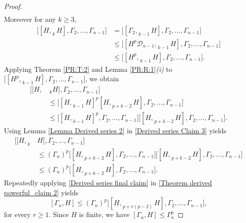 \documentclass[12pt]{elsarticle}
\newtheorem*{main corollary*}{Main Corollary}
\theoremstyle{definition}
\begin{document}
\begin{proof}
\begin{align}
      \end{align}
Moreover for any $k\geq 3$, \begin{align*}
    \bigl[[H,_{\;k} H],\Gamma_2,\ldots, \Gamma_{n-1}\bigr]&= \bigl[[\Gamma_2,_{\;k-1} H],\Gamma_2,\ldots, \Gamma_{n-1}\bigr]\\
    &\leqslant\bigl[[H^p\mathcal{D}_{n-1},_{\;k-1}H],\Gamma_2,\ldots,\Gamma_{n-1}\bigr]\\
    &\leqslant\bigl[[H^p,_{\;k-1}H],\Gamma_2,\ldots,\Gamma_{n-1}\bigr].
    \end{align*}
    Applying Theorem \ref{PR:T:2} and Lemma \ref{PR:R:1}\textit{(i)} to $\bigl[[H^p,_{\;k-1}H],\Gamma_2,\ldots,\Gamma_{n-1}\bigr]$, we obtain
    \begin{align}
        \bigl[[H,&_{\;k} H],\Gamma_2,\ldots, \Gamma_{n-1}\bigr]\nonumber\\
        &\leqslant\bigl[[H,_{\;k-1}H]^p[H,_{\;p+k-2}H],\Gamma_2,\ldots,\Gamma_{n-1}\bigr]\nonumber\\
        &\leqslant\bigl[[H,_{\;k-1}H]^p,\Gamma_2,\ldots,\Gamma_{n-1}\bigr]\bigl[[H,_{\;p+k-2}H],\Gamma_2,\ldots,\Gamma_{n-1}\bigr].\label{Derived series Claim 3}
    \end{align}Using Lemma \ref{Lemma Derived series 2} in \eqref{Derived series Claim 3} yields
\begin{align}
    \bigl[[H,_{\;k}& H],\Gamma_2,\ldots, \Gamma_{n-1}\bigr]\nonumber\\
    &\leqslant   (\Gamma_n)^p\bigl[[H,_{\;p+k-2}H],\Gamma_2,\ldots,\Gamma_{n-1}\bigr]\bigl[[H,_{\;p+k-2}H],\Gamma_2,\ldots,\Gamma_{n-1}\bigr]\nonumber\\
    &\leqslant   (\Gamma_n)^p\bigl[[H,_{\;p+k-2}H],\Gamma_2,\ldots,\Gamma_{n-1}\bigr].\label{Derived series final claim}
\end{align}Repeatedly applying \eqref{Derived series final claim} in \eqref{Theorem derived powerful_claim 2} yields
\[ [\Gamma_n, H]\leqslant  (\Gamma_n)^p \bigl[[H,_{\;p+r(p-2)} H],\Gamma_2,\ldots, \Gamma_{n-1}\bigr],\] for every $r\geq 1$. Since $H$ is finite, we have $[\Gamma_n, H]\leqslant \Gamma_n^p$

\end{proof}
\end{document}

